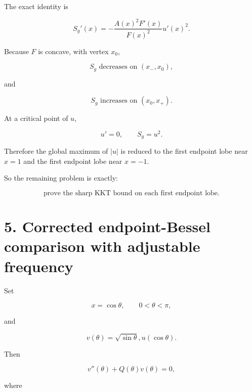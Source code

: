 \documentclass[11pt]{article}
\begin{document}
The exact identity is

\begin{equation*}
\boxed{
S_g'(x)
=
-\frac{A(x)^2F'(x)}{F(x)^2}u'(x)^2.
}
\tag{12}
\end{equation*}


Because \(F\) is concave, with vertex \(x_0\),

\begin{equation*}
S_g \text{ decreases on }(x_-,x_0),
\end{equation*}


and

\begin{equation*}
S_g \text{ increases on }(x_0,x_+).
\end{equation*}


At a critical point of \(u\),

\begin{equation*}
u'=0,
\qquad
S_g=u^2.
\end{equation*}


Therefore the global maximum of \(|u|\) is reduced to the first endpoint lobe near \(x=1\) and the first endpoint lobe near \(x=-1\).

So the remaining problem is exactly:

\begin{equation*}
\boxed{
\text{prove the sharp KKT bound on each first endpoint lobe.}
}
\end{equation*}




\section*{5. Corrected endpoint-Bessel comparison with adjustable frequency}

Set

\begin{equation*}
x=\cos\theta,
\qquad
0<\theta<\pi,
\end{equation*}


and

\begin{equation*}
v(\theta)=\sqrt{\sin\theta},u(\cos\theta).
\end{equation*}


Then

\begin{equation*}
\boxed{
v''(\theta)+Q(\theta)v(\theta)=0,
}
\tag{13}
\end{equation*}


where
\end{document}

